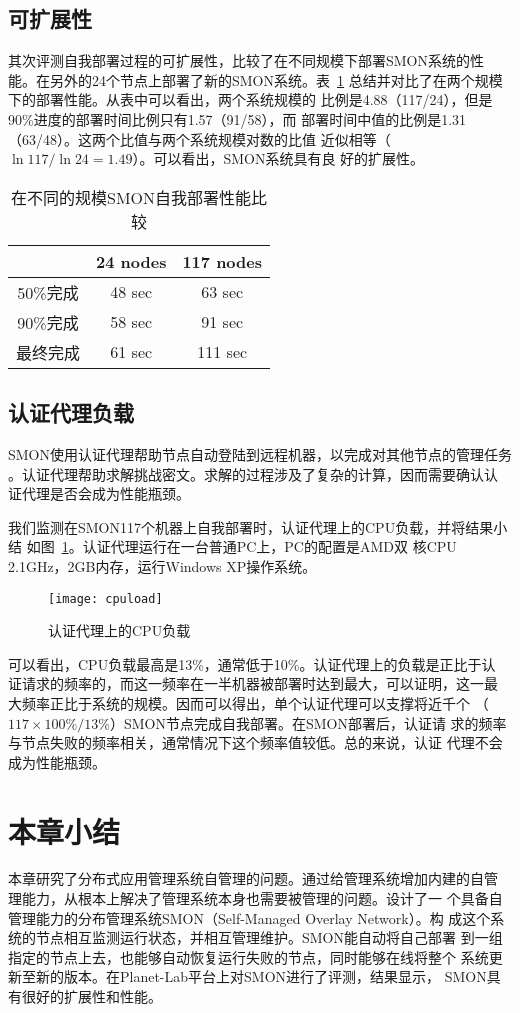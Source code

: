 
\subsection{可扩展性}

其次评测自我部署过程的可扩展性，比较了在不同规模下部署SMON系统的性
能。在另外的24个节点上部署了新的SMON系统。表~\ref{fig:scalability}
总结并对比了在两个规模下的部署性能。从表中可以看出，两个系统规模的
比例是4.88（117/24），但是90\%进度的部署时间比例只有1.57（91/58），而
部署时间中值的比例是1.31（63/48）。这两个比值与两个系统规模对数的比值
近似相等（$\ln 117/\ln 24 = 1.49$）。可以看出，SMON系统具有良
好的扩展性。
\begin{table}[htbp]
\centering
  \begin{minipage}{0.8\linewidth}
    \centering
    \caption{在不同的规模SMON自我部署性能比较}
    \label{fig:scalability}
    \begin{tabular}{ccc}
    \toprule[1.5pt]
           & 24 nodes & 117 nodes\\
    \midrule[1pt]
    50\%完成 & 48 sec & 63 sec \\
    90\%完成 & 58 sec & 91 sec\\
    最终完成 & 61 sec & 111 sec\\
    \bottomrule[1.5pt]
    \end{tabular}
  \end{minipage}
\end{table}

\subsection{认证代理负载}

SMON使用认证代理帮助节点自动登陆到远程机器，以完成对其他节点的管理任务
。认证代理帮助求解挑战密文。求解的过程涉及了复杂的计算，因而需要确认认
证代理是否会成为性能瓶颈。

我们监测在SMON117个机器上自我部署时，认证代理上的CPU负载，并将结果小结
如图~\ref{fig:agentload}。认证代理运行在一台普通PC上，PC的配置是AMD双
核CPU 2.1GHz，2GB内存，运行Windows XP操作系统。

\begin{figure}[htbp]
\centering
\texttt{[image: cpuload]}
\caption{认证代理上的CPU负载}
\label{fig:agentload}
\end{figure}

可以看出，CPU负载最高是13\%，通常低于10\%。认证代理上的负载是正比于认
证请求的频率的，而这一频率在一半机器被部署时达到最大，可以证明，这一最
大频率正比于系统的规模。因而可以得出，单个认证代理可以支撑将近千个
（$117 \times 100\%/13\%$）SMON节点完成自我部署。在SMON部署后，认证请
求的频率与节点失败的频率相关，通常情况下这个频率值较低。总的来说，认证
代理不会成为性能瓶颈。

\section{本章小结}
\label{sec:smon_conclusion}

本章研究了分布式应用管理系统自管理的问题。通过给管理系统增加内建的自管
理能力，从根本上解决了管理系统本身也需要被管理的问题。设计了一
个具备自管理能力的分布管理系统SMON（Self-Managed Overlay Network）。构
成这个系统的节点相互监测运行状态，并相互管理维护。SMON能自动将自己部署
到一组指定的节点上去，也能够自动恢复运行失败的节点，同时能够在线将整个
系统更新至新的版本。在Planet-Lab平台上对SMON进行了评测，结果显示，
SMON具有很好的扩展性和性能。
